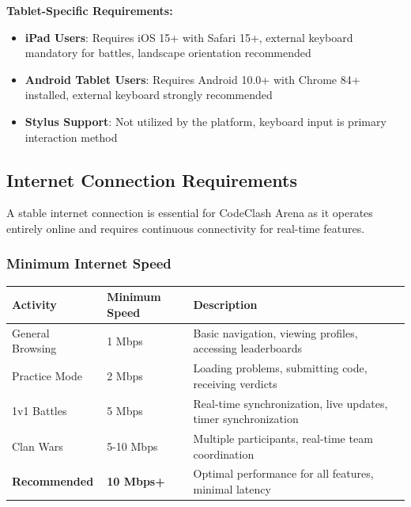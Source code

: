 \documentclass[12pt,a4paper]{article}
\begin{document}
\textbf{Tablet-Specific Requirements:}
\begin{itemize}[leftmargin=*]
\item \textbf{iPad Users}: Requires iOS 15+ with Safari 15+, external keyboard mandatory for battles, landscape orientation recommended
\item \textbf{Android Tablet Users}: Requires Android 10.0+ with Chrome 84+ installed, external keyboard strongly recommended
\item \textbf{Stylus Support}: Not utilized by the platform, keyboard input is primary interaction method
\end{itemize}

\subsection{Internet Connection Requirements}

A stable internet connection is essential for CodeClash Arena as it operates entirely online and requires continuous connectivity for real-time features.

\subsubsection{Minimum Internet Speed}

\begin{longtable}{|p{3.5cm}|p{3cm}|p{7cm}|}
\hline
\textbf{Activity} & \textbf{Minimum Speed} & \textbf{Description} \\
\hline
\endhead

General Browsing & 1 Mbps & Basic navigation, viewing profiles, accessing leaderboards \\
\hline

Practice Mode & 2 Mbps & Loading problems, submitting code, receiving verdicts \\
\hline

1v1 Battles & 5 Mbps & Real-time synchronization, live updates, timer synchronization \\
\hline

Clan Wars & 5-10 Mbps & Multiple participants, real-time team coordination \\
\hline

\textbf{Recommended} & \textbf{10 Mbps+} & Optimal performance for all features, minimal latency \\
\hline

\end{longtable}
\end{document}
